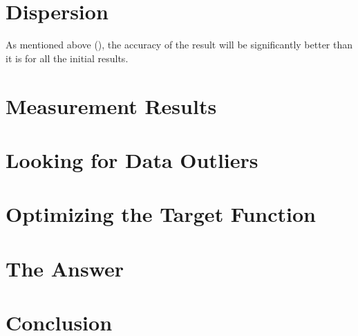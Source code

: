 \documentclass[11pt]{memoir}
\begin{document}
    \section {Dispersion}\label{sec:dispersion}
        \newline
        As mentioned above (), the accuracy of the result will be significantly better than it is for all the initial results.

    \section{Measurement Results}\label{sec:measurement-results}

    \section {Looking for Data Outliers}\label{sec:looking-for-data-outliers}

    \section{Optimizing the Target Function}\label{sec:optimizing-the-target-function}


    \section{The Answer}\label{sec:answer}


    \section{Conclusion}\label{sec:conclusion}



\end{document}

